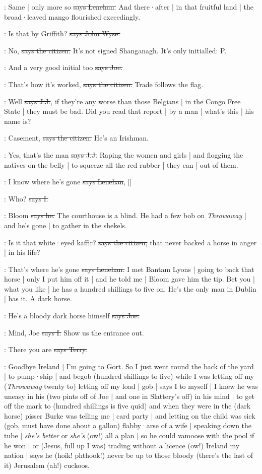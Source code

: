 \lenehan:
Same |
only more so
\sout{says Lenehan.}
And there·after |
in that fruitful land |
the broad·leaved mango flourished exceedingly.

\johnwyse:
Is that by Griffith?
\sout{says John Wyse.}

\citizen:
No,
\sout{says the citizen.}
It's not signed Shanganagh.
It's only initialled:
P.

\joe:
And a very good initial too
\sout{says Joe.}

\citizen:
That's how it's worked,
\sout{says the citizen.}
Trade follows the flag.

\jjom:
Well
\sout{says J.J.},
if they're any worse than those Belgians |
in the Congo Free State |
they must be bad.
Did you read that report |
by a man |
what's this |
his name is?

\citizen:
Casement,
\sout{says the citizen.}
He's an Irishman.

\jjom:
Yes,
that's the man
\sout{says J.J.}
Raping the women and girls |
and flogging the natives on the belly |
to squeeze all the red rubber |
they can |
out of them.

\lenehan:
I know where he's gone
\sout{says Lenehan},
[]

:
Who?
\sout{says I.}

\lenehan:
Bloom
\sout{says he.}
The courthouse is a blind.
He had a few bob on \emph{Throwaway} |
and he's gone |
to gather in the shekels.

\citizen:
Is it that white·eyed kaffir?
\sout{says the citizen,}
that never backed a horse in anger |
in his life?

\lenehan:
That's where he's gone
\sout{says Lenehan.}
I met Bantam Lyons |
going to back that horse |
only I put him off it |
and he told me |
Bloom gave him the tip.
Bet you |
what you like |
he has a hundred shillings to five on.
He's the only man in Dublin |
has it.
A dark horse.

\joe:
He's a bloody dark horse himself
\sout{says Joe.}

:
Mind,
Joe
\sout{says I.}
Show us the entrance out.

\terry:
There you are
\sout{says Terry.}

\Nq:
Goodbye Ireland |
I'm going to Gort.
So I just went round the back of the yard |
to pump·ship |
and begob
(hundred shillings to five)
while I was letting off my
(\emph{Throwaway} twenty to)
letting off my load |
gob |
says I to myself |
I knew he was uneasy in his
(two pints off of Joe |
and one in Slattery's off)
in his mind |
to get off the mark to
(hundred shillings is five quid)
and when they were in the
(dark horse)
pisser Burke
was telling me |
card party |
and letting on the child was sick
(gob,
must have done about a gallon)
flabby·arse of a wife |
speaking down the tube |
\emph{she's better} or \emph{she's}
(ow!)
all a plan |
so he could vamoose with the pool if he won |
or
(Jesus,
full up I was)
trading without a licence
(ow!)
Ireland my nation |
says he
(hoik!
phthook!)
never be up to those bloody
(there's the last of it)
Jerusalem
(ah!)
cuckoos.

